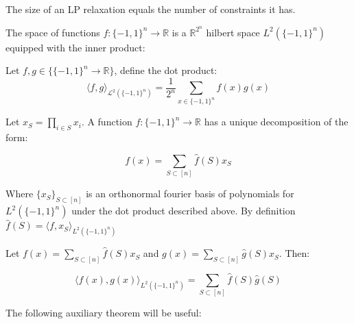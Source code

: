 \begin{definition} The size of an LP relaxation equals the number of constraints it has.
\end{definition}

The space of functions $f : \{-1,1\}^n \rightarrow \mathbb{R}$ is a $\mathbb{R}^{2^n}$ hilbert space $L^2(\{-1,1\}^n)$ equipped with the inner product:

\begin{definition}
Let $f,g \in \{ \{-1,1\}^n \rightarrow \mathbb{R}\}$, define the dot product: 
\begin{equation}
\langle f,g\rangle_{\mathcal{L}^2(\{-1,1\}^n)} = \frac{1}{2^n} \sum_{x \in \{-1,1\}^n} f(x)g(x)
\end{equation}
\end{definition}


\begin{definition}

Let $x_S = \prod_{i \in S} x_i$. A function $f :\{ -1, 1\}^n \rightarrow \mathbb{R}$ has a unique decomposition of the form: 

\begin{equation}
f(x) = \sum_{S \subset [n]} \hat{f}(S)x_S
\end{equation}

Where $\{x_S\}_{S \subset [n]}$ is an orthonormal fourier basis of polynomials for $L^2(\{-1,1\}^n)$ under the dot product described above. By definition $\hat{f}(S) = \langle f, x_S \rangle_{L^2(\{-1,1\}^n)}$
\end{definition}




  
 \begin{lemma}
 Let $f(x) = \sum_{S \subset[n]} \hat{f}(S) x_S$ and $g(x) = \sum_{S \subset [n] } \hat{g}(S)x_S$. Then:
 
 \begin{equation}
 \langle f(x) , g(x) \rangle_{L^2(\{-1,1\}^n)} = \sum_{S \subset [n] }\hat{f}(S)\hat{g}(S)
 \end{equation}
 
 \end{lemma}
  
  
The following auxiliary theorem will be useful:


